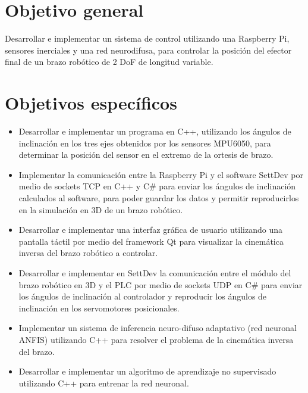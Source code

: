 \section{Objetivo general}

Desarrollar e implementar un sistema de control utilizando una Raspberry Pi, sensores inerciales y una red neurodifusa, para controlar la posición del efector final de un brazo robótico de 2 DoF de longitud variable.

\newpage
\section{Objetivos específicos}
\begin{itemize}
	
	\item Desarrollar e implementar un programa en C++, utilizando los ángulos de inclinación en los tres ejes obtenidos por los sensores MPU6050, para determinar la posición del sensor en el extremo de la ortesis de brazo.
	
	\item Implementar la comunicación entre la Raspberry Pi y el software SettDev por medio de sockets TCP en C++ y C\# para enviar los ángulos de inclinación calculados al software, para poder guardar los datos y permitir reproducirlos en la simulación en 3D de un brazo robótico.
	
	\item Desarrollar e implementar una interfaz gráfica de usuario utilizando una pantalla táctil por medio del framework Qt para visualizar la cinemática inversa del brazo robótico a controlar.
	
	\item Desarrollar e implementar en SettDev la comunicación entre el módulo del brazo robótico en 3D y el PLC por medio de sockets UDP en C\# para enviar los ángulos de inclinación al controlador y reproducir los ángulos de inclinación en los servomotores posicionales.
	
	\item Implementar un sistema de inferencia neuro-difuso adaptativo (red neuronal ANFIS) utilizando C++ para resolver el problema de la cinemática inversa del brazo.
	
	\item Desarrollar e implementar un algoritmo de aprendizaje no supervisado utilizando C++ para entrenar la red neuronal.
	
\end{itemize}